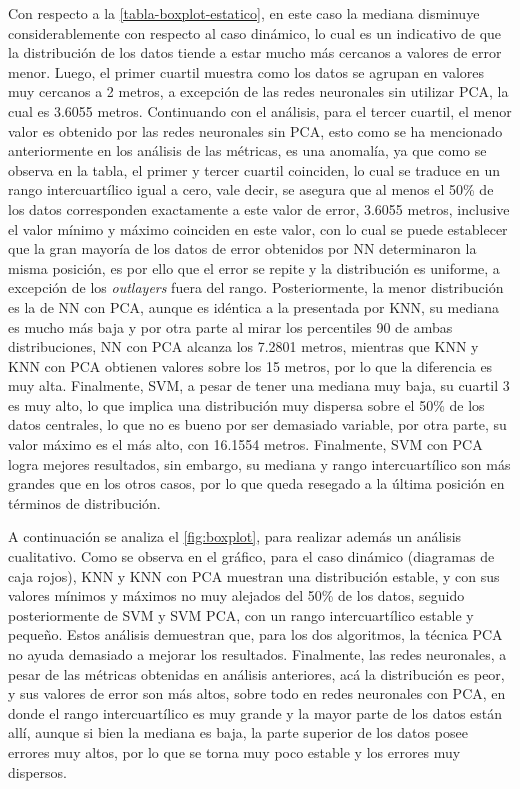 Con respecto a la \autoref{tabla-boxplot-estatico}, en este caso la mediana disminuye considerablemente con respecto al caso dinámico, lo cual es un indicativo de que la distribución de los datos tiende a estar mucho más cercanos a valores de error menor. Luego, el primer cuartil muestra como los datos se agrupan en valores muy cercanos a 2 metros, a excepción de las redes neuronales sin utilizar PCA, la cual es 3.6055 metros. Continuando con el análisis, para el tercer cuartil, el menor valor es obtenido por las redes neuronales sin PCA, esto como se ha mencionado anteriormente en los análisis de las métricas, es una anomalía, ya que como se observa en la tabla, el primer y tercer cuartil coinciden, lo cual se traduce en un rango intercuartílico igual a cero, vale decir, se asegura que al menos el 50\% de los datos corresponden exactamente a este valor de error, 3.6055 metros, inclusive el valor mínimo y máximo coinciden en este valor, con lo cual se puede establecer que la gran mayoría de los datos de error obtenidos por NN determinaron la misma posición, es por ello que el error se repite y la distribución es uniforme, a excepción de los \textit{outlayers} fuera del rango. Posteriormente, la menor distribución es la de NN con PCA, aunque es idéntica a la presentada por KNN, su mediana es mucho más baja y por otra parte al mirar los percentiles 90 de ambas distribuciones, NN con PCA alcanza los 7.2801 metros, mientras que KNN y KNN con PCA obtienen valores sobre los 15 metros, por lo que la diferencia es muy alta. Finalmente, SVM, a pesar de tener una mediana muy baja, su cuartil 3 es muy alto, lo que implica una distribución muy dispersa sobre el 50\% de los datos centrales, lo que no es bueno por ser demasiado variable, por otra parte, su valor máximo es el más alto, con 16.1554 metros. Finalmente, SVM con PCA logra mejores resultados, sin embargo, su mediana y rango intercuartílico son más grandes que en los otros casos, por lo que queda resegado a la última posición en términos de distribución.

A continuación se analiza el \autoref{fig:boxplot}, para realizar además un análisis cualitativo. Como se observa en el gráfico, para el caso dinámico (diagramas de caja rojos), KNN y KNN con PCA muestran una distribución estable, y con sus valores mínimos y máximos no muy alejados del 50\% de los datos, seguido posteriormente de SVM y SVM PCA, con un rango intercuartílico estable y pequeño. Estos análisis demuestran que, para los dos algoritmos, la técnica PCA no ayuda demasiado a mejorar los resultados. Finalmente, las redes neuronales, a pesar de las métricas obtenidas en análisis anteriores, acá la distribución es peor, y sus valores de error son más altos, sobre todo en redes neuronales con PCA, en donde el rango intercuartílico es muy grande y la mayor parte de los datos están allí, aunque si bien la mediana es baja, la parte superior de los datos posee errores muy altos, por lo que se torna muy poco estable y los errores muy dispersos.

